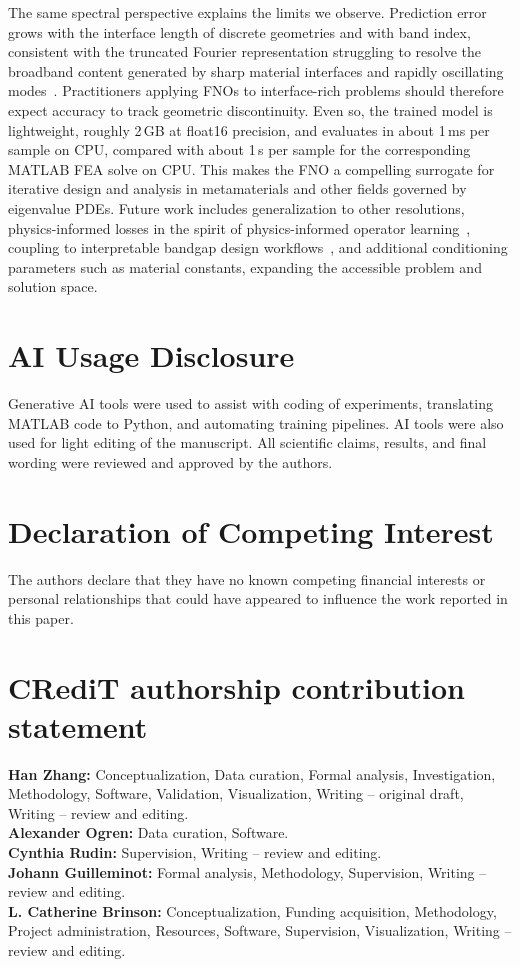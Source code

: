 \documentclass[preprint,review,12pt,numafflabel]{elsarticle}
\begin{document}
The same spectral perspective explains the limits we observe. Prediction error grows with the interface length of discrete geometries and with band index, consistent with the truncated Fourier representation struggling to resolve the broadband content generated by sharp material interfaces and rapidly oscillating modes~\cite{rahaman2019spectral,qin2024spectralfno,cavallazzi2026whno}. Practitioners applying FNOs to interface-rich problems should therefore expect accuracy to track geometric discontinuity. Even so, the trained model is lightweight, roughly 2\,GB at float16 precision, and evaluates in about 1\,ms per sample on CPU, compared with about 1\,s per sample for the corresponding MATLAB FEA solve on CPU. This makes the FNO a compelling surrogate for iterative design and analysis in metamaterials and other fields governed by eigenvalue PDEs. Future work includes generalization to other resolutions, physics-informed losses in the spirit of physics-informed operator learning~\cite{wang2021pidon}, coupling to interpretable bandgap design workflows~\cite{CHEN2022101895,Bastawrous2025}, and additional conditioning parameters such as material constants, expanding the accessible problem and solution space.

\section*{AI Usage Disclosure}
Generative AI tools were used to assist with coding of experiments, translating MATLAB code to Python, and automating training pipelines. AI tools were also used for light editing of the manuscript. All scientific claims, results, and final wording were reviewed and approved by the authors.

\section*{Declaration of Competing Interest}
The authors declare that they have no known competing financial interests or personal relationships that could have appeared to influence the work reported in this paper.

\section*{CRediT authorship contribution statement}
\noindent\textbf{Han Zhang:} Conceptualization, Data curation, Formal analysis, Investigation, Methodology, Software, Validation, Visualization, Writing -- original draft, Writing -- review and editing.\\
\noindent\textbf{Alexander Ogren:} Data curation, Software.\\
\noindent\textbf{Cynthia Rudin:} Supervision, Writing -- review and editing.\\
\noindent\textbf{Johann Guilleminot:} Formal analysis, Methodology, Supervision, Writing -- review and editing.\\
\noindent\textbf{L. Catherine Brinson:} Conceptualization, Funding acquisition, Methodology, Project administration, Resources, Software, Supervision, Visualization, Writing -- review and editing.
\end{document}
